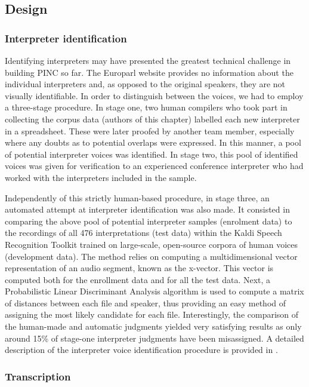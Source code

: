 \documentclass[output=paper]{langscibook}
\begin{document}
\subsection{Design}\label{sec:chmiel:2.2}
\subsubsection{Interpreter identification}\label{sec:chmiel:2.2.1}

Identifying interpreters may have presented the greatest technical challenge in building PINC so far. The Europarl website provides no information about the individual interpreters and, as opposed to the original speakers, they are not visually identifiable. In order to distinguish between the voices, we had to employ a three-stage procedure. In stage one, two human compilers who took part in collecting the corpus data (authors of this chapter) labelled each new interpreter in a spreadsheet. These were later proofed by another team member, especially where any doubts as to potential overlaps were expressed. In this manner, a pool of potential interpreter voices was identified. In stage two, this pool of identified voices was given for verification to an experienced conference interpreter who had worked with the interpreters included in the sample.

Independently of this strictly human-based procedure, in stage three, an automated attempt at interpreter identification was also made. It consisted in comparing the above pool of potential interpreter samples (enrolment data) to the recordings of all 476 interpretations (test data) within the Kaldi Speech Recognition Toolkit \citep{SnyderEtAl2018} trained on large-scale, open-source corpora of human voices (development data). The method relies on computing a multidimensional vector representation of an audio segment, known as the x-vector. This vector is computed both for the enrollment data and for all the test data. Next, a Probabilistic Linear Discriminant Analysis algorithm is used to compute a matrix of distances between each file and speaker, thus providing an easy method of assigning the most likely candidate for each file. Interestingly, the comparison of the human-made and automatic judgments yielded very satisfying results as only around 15\% of stage-one interpreter judgments have been misassigned. A detailed description of the interpreter voice identification procedure is provided in \citet{Korzinek2020ID}.

 \subsubsection{Transcription}\label{sec:chmiel:2.2.2}
 
\end{document}
